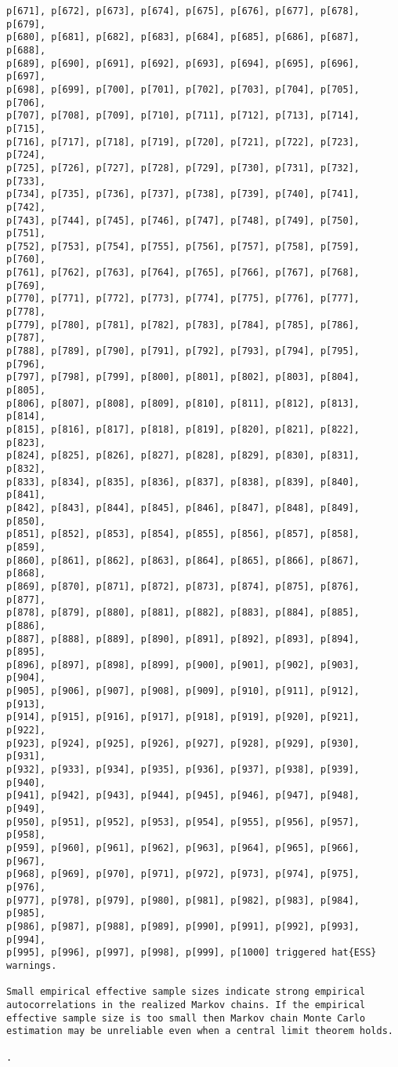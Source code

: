 \documentclass[
  letterpaper,
  DIV=11,
  numbers=noendperiod]{scrartcl}
\begin{document}
\begin{verbatim}
p[671], p[672], p[673], p[674], p[675], p[676], p[677], p[678], p[679],
p[680], p[681], p[682], p[683], p[684], p[685], p[686], p[687], p[688],
p[689], p[690], p[691], p[692], p[693], p[694], p[695], p[696], p[697],
p[698], p[699], p[700], p[701], p[702], p[703], p[704], p[705], p[706],
p[707], p[708], p[709], p[710], p[711], p[712], p[713], p[714], p[715],
p[716], p[717], p[718], p[719], p[720], p[721], p[722], p[723], p[724],
p[725], p[726], p[727], p[728], p[729], p[730], p[731], p[732], p[733],
p[734], p[735], p[736], p[737], p[738], p[739], p[740], p[741], p[742],
p[743], p[744], p[745], p[746], p[747], p[748], p[749], p[750], p[751],
p[752], p[753], p[754], p[755], p[756], p[757], p[758], p[759], p[760],
p[761], p[762], p[763], p[764], p[765], p[766], p[767], p[768], p[769],
p[770], p[771], p[772], p[773], p[774], p[775], p[776], p[777], p[778],
p[779], p[780], p[781], p[782], p[783], p[784], p[785], p[786], p[787],
p[788], p[789], p[790], p[791], p[792], p[793], p[794], p[795], p[796],
p[797], p[798], p[799], p[800], p[801], p[802], p[803], p[804], p[805],
p[806], p[807], p[808], p[809], p[810], p[811], p[812], p[813], p[814],
p[815], p[816], p[817], p[818], p[819], p[820], p[821], p[822], p[823],
p[824], p[825], p[826], p[827], p[828], p[829], p[830], p[831], p[832],
p[833], p[834], p[835], p[836], p[837], p[838], p[839], p[840], p[841],
p[842], p[843], p[844], p[845], p[846], p[847], p[848], p[849], p[850],
p[851], p[852], p[853], p[854], p[855], p[856], p[857], p[858], p[859],
p[860], p[861], p[862], p[863], p[864], p[865], p[866], p[867], p[868],
p[869], p[870], p[871], p[872], p[873], p[874], p[875], p[876], p[877],
p[878], p[879], p[880], p[881], p[882], p[883], p[884], p[885], p[886],
p[887], p[888], p[889], p[890], p[891], p[892], p[893], p[894], p[895],
p[896], p[897], p[898], p[899], p[900], p[901], p[902], p[903], p[904],
p[905], p[906], p[907], p[908], p[909], p[910], p[911], p[912], p[913],
p[914], p[915], p[916], p[917], p[918], p[919], p[920], p[921], p[922],
p[923], p[924], p[925], p[926], p[927], p[928], p[929], p[930], p[931],
p[932], p[933], p[934], p[935], p[936], p[937], p[938], p[939], p[940],
p[941], p[942], p[943], p[944], p[945], p[946], p[947], p[948], p[949],
p[950], p[951], p[952], p[953], p[954], p[955], p[956], p[957], p[958],
p[959], p[960], p[961], p[962], p[963], p[964], p[965], p[966], p[967],
p[968], p[969], p[970], p[971], p[972], p[973], p[974], p[975], p[976],
p[977], p[978], p[979], p[980], p[981], p[982], p[983], p[984], p[985],
p[986], p[987], p[988], p[989], p[990], p[991], p[992], p[993], p[994],
p[995], p[996], p[997], p[998], p[999], p[1000] triggered hat{ESS}
warnings.

Small empirical effective sample sizes indicate strong empirical
autocorrelations in the realized Markov chains. If the empirical
effective sample size is too small then Markov chain Monte Carlo
estimation may be unreliable even when a central limit theorem holds.

.
\end{verbatim}
\end{document}
